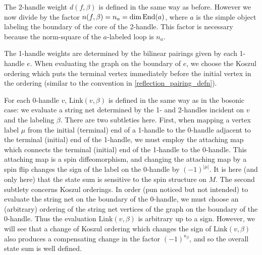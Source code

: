 The 2-handle weight $d(f, \beta)$ is defined in the same way as before. 
However we now divide by the factor $n(f, \beta) = n_a = \dim\text{End}(a)$,
where $a$ is the simple object labeling the boundary of the core of the 2-handle.
This factor is necessary because the norm-square of the $a$-labeled loop is $n_a$.

The 1-handle weights are determined by the bilinear pairings given by each 1-handle $e$. 
When evaluating the graph on the boundary of $e$, we choose the Koszul ordering which puts the terminal vertex
immediately before the initial vertex in the ordering (similar to the convention in \eqref{reflection_pairing_defn}).

For each 0-handle $v$, $\text{Link}(v,\beta)$ is defined in the same way as in the bosonic case:
we evaluate a string net determined by the 1- and 2-handles incident on $v$ and the labeling $\beta$.
There are two subtleties here.
First, when mapping a vertex label $\mu$ from the initial (terminal) end of a 1-handle to the 0-handle adjacent to the terminal (initial) end of the 1-handle, 
we must employ the attaching map which connects the terminal (initial) end of the 1-handle to the 0-handle.
This attaching map is a spin diffeomorphism, 
and changing the attaching map by a spin flip changes the sign
of the label on the 0-handle by $(-1)^{|\mu|}$.
It is here (and only here) that the state sum is sensitive to the spin structure on $M$.
The second subtlety concerns Koszul orderings.
In order (pun noticed but not intended)
to evaluate the string net on the boundary of the 0-handle, we must choose an (arbitrary) ordering
of the string net vertices of the graph on the boundary of the 0-handle.
Thus the evaluation $\text{Link}(v, \beta)$ is arbitrary up to a sign.
However, we will see that a change of Koszul ordering which changes the sign of $\text{Link}(v, \beta)$ also produces a compensating
change in the factor $(-1)^{\kappa_\beta}$, and so the overall state sum is well defined.


